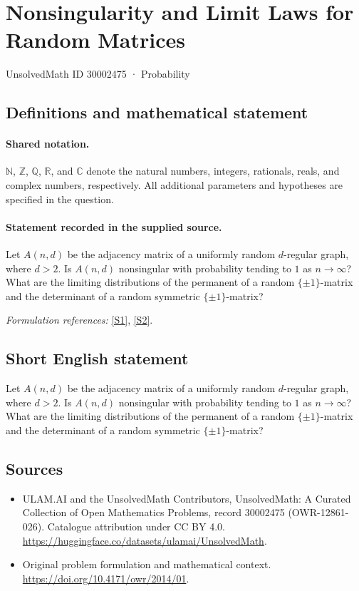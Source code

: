 \documentclass[11pt]{article}
\newcommand{\sref}[2]{\hyperlink{source:#1:#2}{[S#2]}}
\begin{document}
\setcounter{section}{30002474}
\section{Nonsingularity and Limit Laws for Random Matrices}\label{30002475}
{\small UnsolvedMath ID 30002475 · Probability}
\subsection{Definitions and mathematical statement}

\paragraph{Shared notation.}$\mathbb N$, $\mathbb Z$, $\mathbb Q$, $\mathbb R$, and $\mathbb C$ denote the natural numbers, integers, rationals, reals, and complex numbers, respectively. All additional parameters and hypotheses are specified in the question.


\paragraph{Statement recorded in the supplied source.}
Let $A(n,d)$ be the adjacency matrix of a uniformly random $d$-regular graph, where $d>2$. Is $A(n,d)$ nonsingular with probability tending to $1$ as $n\to\infty$? What are the limiting distributions of the permanent of a random $\{\pm1\}$-matrix and the determinant of a random symmetric $\{\pm1\}$-matrix?
\par\smallskip\textit{Formulation references:} \sref{30002475}{1}, \sref{30002475}{2}.
\subsection{Short English statement}
Let $A(n,d)$ be the adjacency matrix of a uniformly random $d$-regular graph, where $d>2$. Is $A(n,d)$ nonsingular with probability tending to $1$ as $n\to\infty$? What are the limiting distributions of the permanent of a random $\{\pm1\}$-matrix and the determinant of a random symmetric $\{\pm1\}$-matrix?
\subsection{Sources}
\begin{itemize}
\item[\hypertarget{source:30002475:1}{S1}] ULAM.AI and the UnsolvedMath Contributors, UnsolvedMath: A Curated Collection of Open Mathematics Problems, record 30002475 (OWR-12861-026). Catalogue attribution under CC BY 4.0.
\url{https://huggingface.co/datasets/ulamai/UnsolvedMath}.
\item[\hypertarget{source:30002475:2}{S2}] Original problem formulation and mathematical context.
\url{https://doi.org/10.4171/owr/2014/01}.
\end{itemize}
\label{end:30002475}
\end{document}
